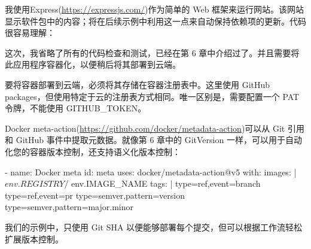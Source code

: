 
我使用Express(\url{https://expressjs.com/})作为简单的 Web 框架来运行网站。该网站显示软件包中的内容；将在后续示例中利用这一点来自动保持依赖项的更新。代码很容易理解：


这次，我省略了所有的代码检查和测试，已经在第 6 章中介绍过了。并且需要将此应用程序容器化，以便稍后将其部署到云端。

要将容器部署到云端，必须将其存储在容器注册表中。这里使用 GitHub packages，但使用特定于云的注册表方式相同。唯一区别是，需要配置一个 PAT 令牌，不能使用 GITHUB\_TOKEN。


Docker meta-action(\url{https://github.com/docker/metadata-action})可以从 Git 引用和 GitHub 事件中提取元数据。就像第 6 章中的 GitVersion 一样，可以用于自动化您的容器版本控制，还支持语义化版本控制：

\begin{shell}
- name: Docker meta
  id: meta
  uses: docker/metadata-action@v5
  with:
    images: |
      ${{ env.REGISTRY }}/${{ env.IMAGE_NAME }}
    tags: |
      type=ref,event=branch
      type=ref,event=pr
      type=semver,pattern={{version}}
      type=semver,pattern={{major}}.{{minor}}
\end{shell}

我们的示例中，只使用 Git SHA 以便能够部署每个提交，但可以根据工作流轻松扩展版本控制。
